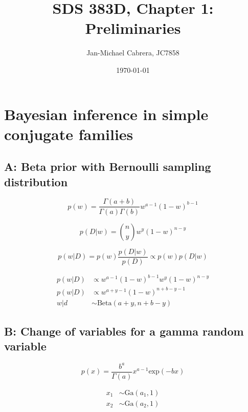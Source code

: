 \documentclass[12pt]{article}
\begin{document}
      \title{SDS 383D, Chapter 1: Preliminaries}
      \author{Jan-Michael Cabrera, JC7858}
      \date{\today}
      \maketitle

      \section*{Bayesian inference in simple conjugate families}

      \subsection*{A: Beta prior with Bernoulli sampling distribution}

            \begin{equation}
                  p(w) = \frac{\Gamma(a+b)}{\Gamma(a)\Gamma(b)}w^{a-1}(1-w)^{b-1}
            \end{equation}

            \begin{equation}
                  p(D|w) = \binom{n}{y} w^y (1 - w)^{n-y}
            \end{equation}

            \begin{equation}
                  p(w|D) = p(w) \frac{p(D|w)}{p(D)} \propto p(w) p(D|w)
            \end{equation}

            \begin{align}
                  p(w|D) &\propto w^{a-1}(1-w)^{b-1}w^y(1-w)^{n-y} \\
                  p(w|D) &\propto w^{a+y-1}(1-w)^{n+b-y-1} \\
                  w|d &\sim \text{Beta}(a+y, n+b-y)
            \end{align}


      \subsection*{B: Change of variables for a gamma random variable}

            \begin{equation}
                  p(x) = \frac{b^a}{\Gamma(a)}x^{a-1} \text{exp}(-bx)
            \end{equation}

            \begin{align}
                  x_1 &\sim \text{Ga}(a_1, 1)\\
                  x_2 &\sim \text{Ga}(a_2, 1)
            \end{align}
\end{document}
